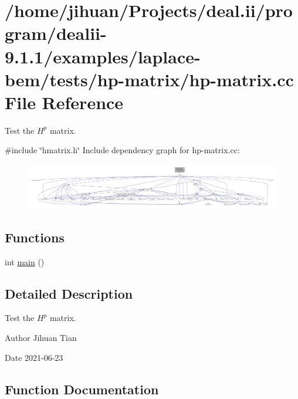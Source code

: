 \hypertarget{hp-matrix_8cc}{}\section{/home/jihuan/\+Projects/deal.ii/program/dealii-\/9.1.1/examples/laplace-\/bem/tests/hp-\/matrix/hp-\/matrix.cc File Reference}
\label{hp-matrix_8cc}


Test the $H^p$ matrix.  


{\ttfamily \#include \char`\"{}hmatrix.\+h\char`\"{}}\newline
Include dependency graph for hp-\/matrix.cc\+:\nopagebreak
\begin{figure}[H]
\begin{center}
\leavevmode
\includegraphics[width=350pt]{hp-matrix_8cc__incl}
\end{center}
\end{figure}
\subsection*{Functions}
\begin{DoxyCompactItemize}
\item 
int \hyperlink{hp-matrix_8cc_ae66f6b31b5ad750f1fe042a706a4e3d4}{main} ()
\end{DoxyCompactItemize}


\subsection{Detailed Description}
Test the $H^p$ matrix. 

\begin{DoxyAuthor}{Author}
Jihuan Tian 
\end{DoxyAuthor}
\begin{DoxyDate}{Date}
2021-\/06-\/23 
\end{DoxyDate}


\subsection{Function Documentation}
\mbox{\label{hp-matrix_8cc_ae66f6b31b5ad750f1fe042a706a4e3d4}} 
